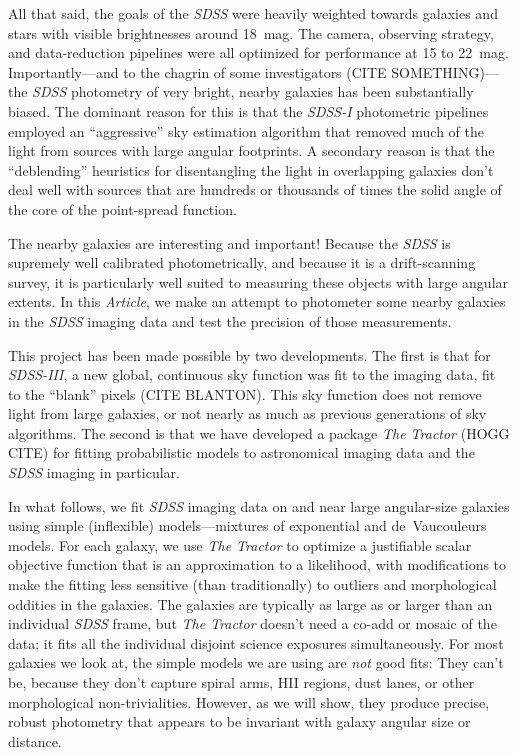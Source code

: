 \documentclass[12pt,preprint,pdftex]{aastex}
\newcommand{\project}[1]{\textsl{#1}}
\newcommand{\documentname}{\textsl{Article}}
\begin{document}
All that said, the goals of the \project{SDSS} were heavily weighted
towards galaxies and stars with visible brightnesses around 18~mag.
The camera, observing strategy, and data-reduction pipelines were all
optimized for performance at 15 to 22~mag.  Importantly---and to the
chagrin of some investigators (CITE SOMETHING)---the \project{SDSS}
photometry of very bright, nearby galaxies has been substantially
biased.  The dominant reason for this is that the \project{SDSS-I}
photometric pipelines employed an ``aggressive'' sky estimation
algorithm that removed much of the light from sources with large
angular footprints.  A secondary reason is that the ``deblending''
heuristics for disentangling the light in overlapping galaxies don't
deal well with sources that are hundreds or thousands of times the
solid angle of the core of the point-spread function.

The nearby galaxies are interesting and important!  Because the
\project{SDSS} is supremely well calibrated photometrically, and
because it is a drift-scanning survey, it is particularly well suited
to measuring these objects with large angular extents.  In this
\documentname, we make an attempt to photometer some nearby galaxies
in the \project{SDSS} imaging data and test the precision of those
measurements.

This project has been made possible by two developments.  The first is
that for \project{SDSS-III}, a new global, continuous sky function was
fit to the imaging data, fit to the ``blank'' pixels (CITE BLANTON).  This sky
function does not remove light from large galaxies, or not nearly as
much as previous generations of sky algorithms.  The second is that we
have developed a package \project{The Tractor} (HOGG CITE) for fitting
probabilistic models to astronomical imaging data and the
\project{SDSS} imaging in particular.

In what follows, we fit \project{SDSS} imaging
data on and near large angular-size galaxies using simple (inflexible)
models---mixtures of exponential and de~Vaucouleurs models.  For each
galaxy, we use \project{The Tractor} to
optimize a justifiable scalar objective function that is an
approximation to a likelihood, with modifications to make the fitting
less sensitive (than traditionally) to outliers and morphological
oddities in the galaxies.  The galaxies are typically as large as or
larger than an individual \project{SDSS} frame, but \project{The
  Tractor} doesn't need a co-add or mosaic of the data; it fits all
the individual disjoint science exposures simultaneously.  For most
galaxies we look at, the simple models we are using are \emph{not}
good fits: They can't be, because they don't capture spiral arms, HII
regions, dust lanes, or other morphological non-trivialities.
However, as we will show, they produce precise, robust photometry that
appears to be invariant with galaxy angular size or distance.
\end{document}
